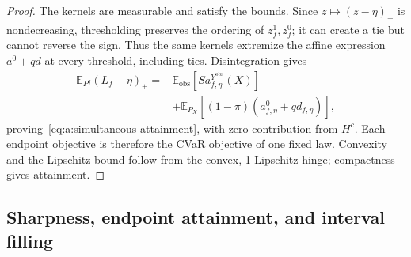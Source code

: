 \begin{proof}
The kernels are measurable and satisfy the bounds. Since $z\mapsto(z-\eta)_+$ is nondecreasing, thresholding preserves the ordering of $z_f^1,z_f^0$; it can create a tie but cannot reverse the sign. Thus the same kernels extremize the affine expression $a^0+qd$ at every threshold, including ties. Disintegration gives
\begin{equation}
\begin{split}
\mathbb E_{P^q}(L_f-\eta)_+
={}&\mathbb E_{\mathrm{obs}}[S a^{Y^{\mathrm{obs}}}_{f,\eta}(X)]\\
&+\mathbb E_{P_X}[(1-\pi)(a^0_{f,\eta}+qd_{f,\eta})],
\end{split}
\label{eq:a:excess-disintegration}
\end{equation}
proving~\eqref{eq:a:simultaneous-attainment}, with zero contribution from $H^c$. Each endpoint objective is therefore the CVaR objective of one fixed law. Convexity and the Lipschitz bound follow from the convex, 1-Lipschitz hinge; compactness gives attainment.
\end{proof}

\subsection{Sharpness, endpoint attainment, and interval filling}
\label{app:sharpness}

